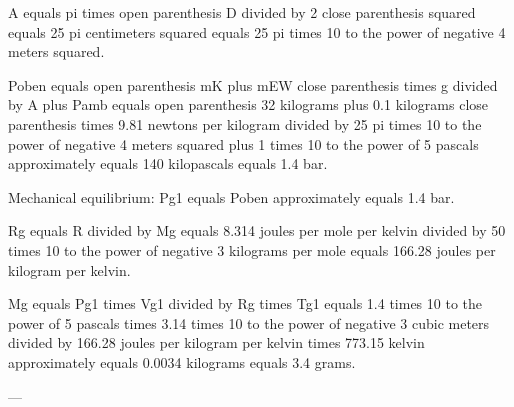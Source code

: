 A equals pi times open parenthesis D divided by 2 close parenthesis squared equals 25 pi centimeters squared equals 25 pi times 10 to the power of negative 4 meters squared.  

Poben equals open parenthesis mK plus mEW close parenthesis times g divided by A plus Pamb equals open parenthesis 32 kilograms plus 0.1 kilograms close parenthesis times 9.81 newtons per kilogram divided by 25 pi times 10 to the power of negative 4 meters squared plus 1 times 10 to the power of 5 pascals approximately equals 140 kilopascals equals 1.4 bar.  

Mechanical equilibrium:  
Pg1 equals Poben approximately equals 1.4 bar.  

Rg equals R divided by Mg equals 8.314 joules per mole per kelvin divided by 50 times 10 to the power of negative 3 kilograms per mole equals 166.28 joules per kilogram per kelvin.  

Mg equals Pg1 times Vg1 divided by Rg times Tg1 equals 1.4 times 10 to the power of 5 pascals times 3.14 times 10 to the power of negative 3 cubic meters divided by 166.28 joules per kilogram per kelvin times 773.15 kelvin approximately equals 0.0034 kilograms equals 3.4 grams.  

---